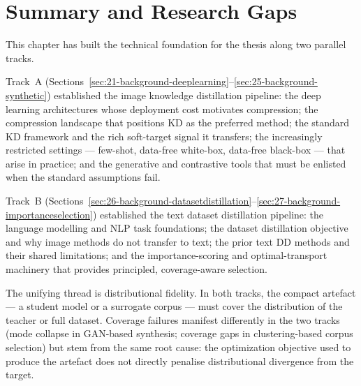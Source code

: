 \section{Summary and Research Gaps} \label{sec:28-background-summary}

\begin{foldable}
  This chapter has built the technical foundation for the thesis along two parallel tracks.
\end{foldable}

\begin{foldable}
  Track~A (Sections~\ref{sec:21-background-deeplearning}--\ref{sec:25-background-synthetic}) established the image knowledge distillation pipeline: the deep learning architectures whose deployment cost motivates compression;
  the compression landscape that positions KD as the preferred method; the standard KD framework and the rich soft-target signal it transfers; the increasingly restricted settings --- few-shot, data-free white-box, data-free black-box --- that arise in practice;
  and the generative and contrastive tools that must be enlisted when the standard assumptions fail.
\end{foldable}

\begin{foldable}
  Track~B (Sections~\ref{sec:26-background-datasetdistillation}--\ref{sec:27-background-importanceselection}) established the text dataset distillation pipeline: the language modelling and \ac{NLP} task foundations;
  the dataset distillation objective and why image methods do not transfer to text;
  the prior text DD methods and their shared limitations;
  and the importance-scoring and optimal-transport machinery that provides principled, coverage-aware selection.
\end{foldable}

\begin{foldable}
  The unifying thread is distributional fidelity.
  In both tracks, the compact artefact --- a student model or a surrogate corpus --- must cover the distribution of the teacher or full dataset.
  Coverage failures manifest differently in the two tracks (mode collapse in GAN-based synthesis;
  coverage gaps in clustering-based corpus selection) but stem from the same root cause: the optimization objective used to produce the artefact does not directly penalise distributional divergence from the target.
\end{foldable}

